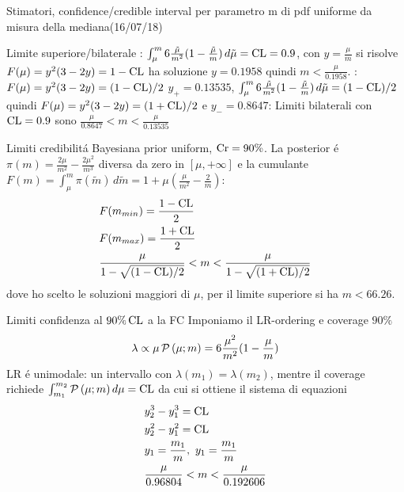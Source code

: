 \begin{wordonframe}{Stimatori, confidence/credible interval per parametro m di pdf uniforme da misura della mediana(16/07/18)}
	\begin{block}{Limite superiore/bilaterale}
		: $\int_{\mu}^m6\frac{\tilde{\mu}}{m^2}(1-\frac{\tilde{\mu}}{m})\,d\tilde{\mu}=\operatorname{CL}=0.9$, con $y=\frac{\mu}{m}$ si risolve $F(\mu)=y^2(3-2y)=1-\operatorname{CL}$ ha soluzione $y=0.1958$ quindi $m<\frac{\mu}{0.1958}$.
		: $F(\mu)=y^2(3-2y)=(1-\operatorname{CL})/2$ $y_+=0.13535$, $\int_{\mu}^m6\frac{\tilde{\mu}}{m^2}(1-\frac{\tilde{\mu}}{m})\,d\tilde{\mu}=(1-\operatorname{CL})/2$ quindi $F(\mu)=y^2(3-2y)=(1+\operatorname{CL})/2$ e $y_-=0.8647$: Limiti bilaterali con $\operatorname{CL}=0.9$ sono $\frac{\mu}{0.8647}<m<\frac{\mu}{0.13535}$
	\end{block}
	\begin{block}{Limiti credibilit\'a Bayesiana}
		prior uniform, $\operatorname{Cr}=90\%$. La posterior \'e $\pi(m)=\frac{2\mu}{m^2}-\frac{2\mu^2}{m^3}$ diversa da zero in $[\mu,+\infty]$ e la cumulante $F(m)=\int_{\mu}^m\pi(\tilde{m})\,d\tilde{m}=1+\mu(\frac{\mu}{m^2}-\frac{2}{m})$:
		\begin{align*}
		&F(m_{min})=\frac{1-\operatorname{CL}}{2}\\
		&F(m_{max})=\frac{1+\operatorname{CL}}{2}\\
		&\frac{\mu}{1-\sqrt{(1-\operatorname{CL})/2}}<m<\frac{\mu}{1-\sqrt{(1+\operatorname{CL})/2}}
		\end{align*}
		dove ho scelto le soluzioni maggiori di $\mu$, per il limite superiore si ha $m<66.26$.
	\end{block}
	\begin{block}{Limiti confidenza al $90\%\operatorname{CL}$ a la FC}
		Imponiamo il LR-ordering e coverage $90\%$
		\begin{equation*}
		\lambda\propto\mu\operatorname{\mathcal{P}}{(\mu;m)}=6\frac{\mu^2}{m^2}(1-\frac{\mu}{m})
		\end{equation*}
		LR \'e unimodale: un intervallo con $\lambda(m_1)=\lambda(m_2)$, mentre il coverage richiede $\int_{m_1}^{m_2}\operatorname{\mathcal{P}}{(\mu;m)}\,d\mu=\operatorname{CL}$ da cui si ottiene il sistema di equazioni
		\begin{align*}
		&y_2^3-y_1^3=\operatorname{CL}\\
		&y_2^2-y_1^2=\operatorname{CL}\\
		&y_1=\frac{m_1}{m},\ y_1=\frac{m_1}{m}\\
		&\frac{\mu}{0.96804}<m<\frac{\mu}{0.192606}
		\end{align*}
	\end{block}

\end{wordonframe}
